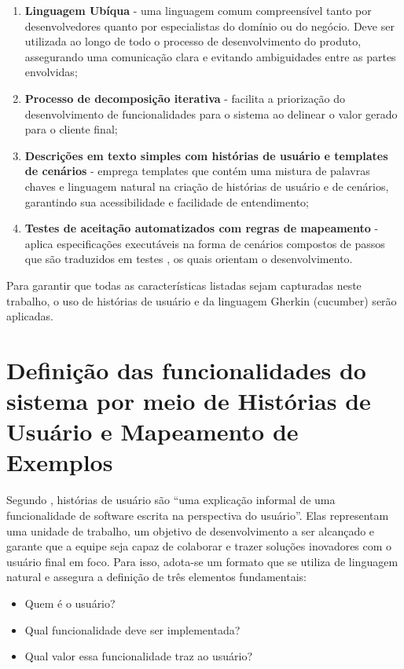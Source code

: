 \begin{enumerate}
	\item \textbf{Linguagem Ubíqua} - uma linguagem comum compreensível tanto por desenvolvedores quanto por especialistas do domínio ou do negócio. Deve ser utilizada 
	ao longo de todo o processo de desenvolvimento do produto, assegurando uma comunicação clara e evitando ambiguidades entre as partes envolvidas;
	\item \textbf{Processo de decomposição iterativa} - facilita a priorização do desenvolvimento de funcionalidades para o sistema ao delinear o valor gerado para o cliente final;
	\item \textbf{Descrições em texto simples com histórias de usuário e templates de cenários} - emprega templates que contém uma mistura de palavras chaves e linguagem natural na 
	criação de histórias de usuário e de cenários, garantindo sua acessibilidade e facilidade de entendimento;
	\item \textbf{Testes de aceitação automatizados com regras de mapeamento} - aplica especificações executáveis na forma de cenários compostos de passos que são traduzidos em testes
	, os quais orientam o desenvolvimento.
\end{enumerate}

Para garantir que todas as características listadas sejam capturadas neste trabalho, o uso de histórias de usuário \cite{atlassianUserStories} e da 
linguagem Gherkin (cucumber) \cite{cucumberHistory} serão aplicadas.


\section{Definição das funcionalidades do sistema por meio de Histórias de Usuário e Mapeamento de Exemplos}

Segundo \cite{atlassianUserStories}, histórias de usuário são “uma explicação informal de uma funcionalidade de software escrita na perspectiva do usuário”. Elas 
representam uma unidade de trabalho, um objetivo de desenvolvimento a ser alcançado e garante que a equipe seja capaz de colaborar e trazer soluções inovadores 
com o usuário final em foco. 
Para isso, adota-se um formato que se utiliza de linguagem natural e assegura a definição de três elementos fundamentais:

\begin{itemize}
	\item Quem é o usuário?
	\item Qual funcionalidade deve ser implementada?
	\item Qual valor essa funcionalidade traz ao usuário?
\end{itemize}

